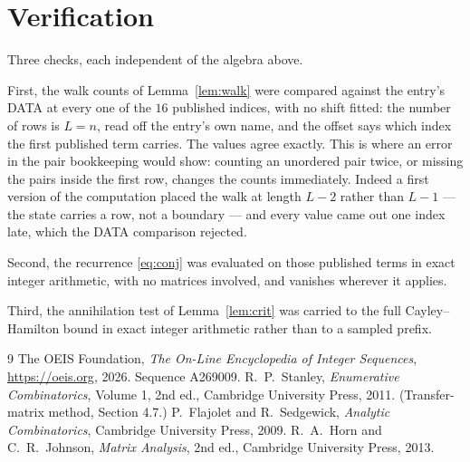 \documentclass[11pt,a4paper]{article}
\theoremstyle{plain}
\theoremstyle{definition}
\begin{document}
\section{Verification}

Three checks, each independent of the algebra above.

First, the walk counts of Lemma~\ref{lem:walk} were compared against the entry's DATA at
every one of the $16$ published indices, with no shift fitted: the number of rows is
$L=n$, read off the entry's own name, and the offset says which index the first
published term carries. The values agree exactly. This is where an error in the pair
bookkeeping would show: counting an unordered pair twice, or missing the pairs inside the
first row, changes the counts immediately. Indeed a first version of the computation
placed the walk at length $L-2$ rather than $L-1$ --- the state carries a row, not a
boundary --- and every value came out one index late, which the DATA comparison rejected.

Second, the recurrence \eqref{eq:conj} was evaluated on those published terms in exact
integer arithmetic, with no matrices involved, and vanishes wherever it applies.

Third, the annihilation test of Lemma~\ref{lem:crit} was carried to the full
Cayley--Hamilton bound in exact integer arithmetic rather than to a sampled prefix.

\begin{thebibliography}{9}
 The OEIS Foundation, \emph{The On-Line Encyclopedia of Integer
Sequences}, \url{https://oeis.org}, 2026. Sequence A269009.
 R.~P.~Stanley, \emph{Enumerative Combinatorics}, Volume 1, 2nd ed.,
Cambridge University Press, 2011. (Transfer-matrix method, Section 4.7.)
 P.~Flajolet and R.~Sedgewick, \emph{Analytic Combinatorics}, Cambridge
University Press, 2009.
 R.~A.~Horn and C.~R.~Johnson, \emph{Matrix Analysis}, 2nd ed., Cambridge
University Press, 2013.
\end{thebibliography}
\end{document}
